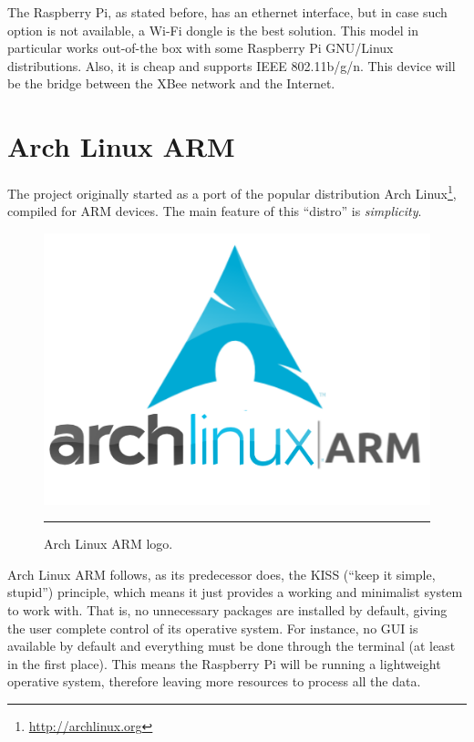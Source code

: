 The Raspberry Pi, as stated before, has an ethernet interface, but in case such option is not available, a Wi-Fi dongle is the best solution. This model in particular works out-of-the box with some Raspberry Pi GNU/Linux distributions. Also, it is cheap and supports IEEE 802.11b/g/n. This device will be the bridge between the XBee network and the Internet.


\section{Arch Linux ARM}
\label{sec:alarmmm}

The project originally started as a port of the popular distribution Arch Linux\footnote{\url{http://archlinux.org}}, compiled for ARM devices. The main feature of this ``distro'' is \emph{simplicity}.

\begin{figure}[htbp]
    \centering
    \includegraphics[scale=0.4]{./Figures/alarm.png}
        \rule{35em}{0.5pt}
        \caption[Arch Linux ARM Logo]{Arch Linux ARM logo.}
    \label{fig:alarm_logo}
\end{figure}

Arch Linux ARM follows, as its predecessor does, the KISS (``keep it simple, stupid'') principle, which means it just provides a working and minimalist system to work with. That is, no unnecessary packages are installed by default, giving the user complete control of its operative system. For instance, no GUI is available by default and everything must be done through the terminal (at least in the first place). This means the Raspberry Pi will be running a lightweight operative system, therefore leaving more resources to process all the data.


